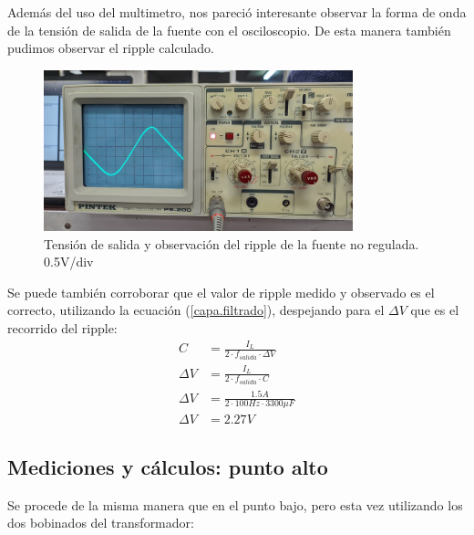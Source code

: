 \documentclass[chaptersright]{informeutn}
\begin{document}
        Además del uso del multimetro, nos pareció interesante observar la forma de onda de la tensión de salida de la
        fuente con el osciloscopio. De esta manera también pudimos observar el ripple calculado.
        \begin{figure}[H]
          \centering
          \includegraphics[width=0.8\textwidth]{pictures/ripple_fuente-nreg.jpeg}
          \caption{Tensión de salida y observación del ripple de la fuente no regulada. 0.5V/div}
        \end{figure}

        Se puede también corroborar que el valor de ripple medido y observado es el correcto, utilizando la ecuación
        (\ref{capa.filtrado}), despejando para el $\Delta V$ que es el recorrido del ripple:
        \begin{align*}
          C &= \frac{I_{L}}{2 \cdot f_{salida} \cdot \varDelta V}\\[6pt]
          \varDelta V &= \frac{I_{L}}{2 \cdot f_{salida} \cdot C}\\[6pt]
          \varDelta V &= \frac{1.5A}{2 \cdot 100Hz \cdot 3300\mu F}\\[6pt]
          \varDelta V &= 2.27V
        \end{align*}

        \subsection{Mediciones y cálculos: punto alto}
            Se procede de la misma manera que en el punto bajo, pero esta vez utilizando los dos bobinados del
            transformador:
\end{document}
